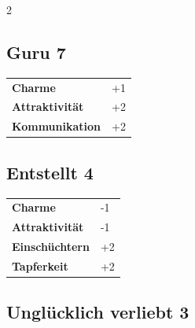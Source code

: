 \begin{multicols}{2}
\begin{tcolorbox}
\end{tcolorbox}

\begin{tcolorbox}
    \subsection*{Guru \hfill \small{7 }}
    \tcblower




\begin{tabular}{@{}ll@{}}
    \textbf{Charme} & +1\\
    \textbf{Attraktivität} & +2\\
    \textbf{Kommunikation} & +2\\
\end{tabular}


\end{tcolorbox}

\begin{tcolorbox}
    \subsection*{Entstellt \hfill \small{4 }}
    \tcblower




\begin{tabular}{@{}ll@{}}
    \textbf{Charme} & -1\\
    \textbf{Attraktivität} & -1\\
    \textbf{Einschüchtern} & +2\\
    \textbf{Tapferkeit} & +2\\
\end{tabular}


\end{tcolorbox}

\begin{tcolorbox}
    \subsection*{Unglücklich verliebt \hfill \small{3 }}
    \tcblower





\end{tcolorbox}
\end{multicols}
